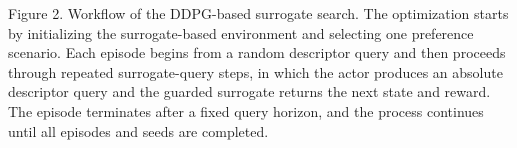 Figure 2. Workflow of the DDPG-based surrogate search. The optimization
starts by initializing the surrogate-based environment and selecting one
preference scenario. Each episode begins from a random descriptor query
and then proceeds through repeated surrogate-query steps, in which the
actor produces an absolute descriptor query and the guarded surrogate
returns the next state and reward. The episode terminates after a fixed
query horizon, and the process continues until all episodes and seeds are
completed.
